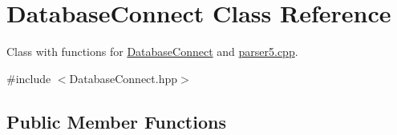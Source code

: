 \hypertarget{classDatabaseConnect}{}\section{Database\+Connect Class Reference}
\label{classDatabaseConnect}


Class with functions for \mbox{\hyperlink{classDatabaseConnect}{Database\+Connect}} and \mbox{\hyperlink{parser5_8cpp}{parser5.\+cpp}}.  




{\ttfamily \#include $<$Database\+Connect.\+hpp$>$}

\subsection*{Public Member Functions}
